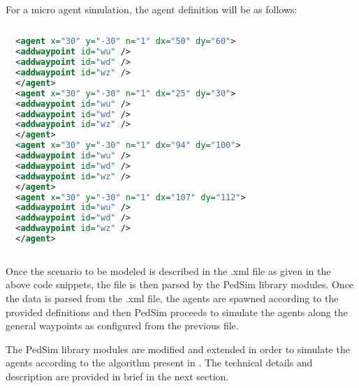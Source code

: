 For a micro agent simulation, the agent definition will be as follows:
\\

\begin{lstlisting}[language=xml]
  
  <agent x="30" y="-30" n="1" dx="50" dy="60">
  <addwaypoint id="wu" />
  <addwaypoint id="wd" />
  <addwaypoint id="wz" />
  </agent> 
  <agent x="30" y="-30" n="1" dx="25" dy="30">
  <addwaypoint id="wu" />
  <addwaypoint id="wd" />
  <addwaypoint id="wz" />
  </agent> 
  <agent x="30" y="-30" n="1" dx="94" dy="100">
  <addwaypoint id="wu" />
  <addwaypoint id="wd" />
  <addwaypoint id="wz" />
  </agent> 
  <agent x="30" y="-30" n="1" dx="107" dy="112">
  <addwaypoint id="wu" />
  <addwaypoint id="wd" />
  <addwaypoint id="wz" />
  </agent>
    
\end{lstlisting}

Once the scenario to be modeled is described in the .xml file as given in the above code snippets, the file is then parsed by the PedSim library modules. Once the data is parsed from the .xml file, the agents are spawned according to the provided definitions and then PedSim proceeds to simulate the agents along the general waypoints as configured from the previous file.

The PedSim library modules are modified and extended in order to simulate the agents according to the algorithm present in \cite{ref5}. The technical details and description are provided in brief in the next section.
 
